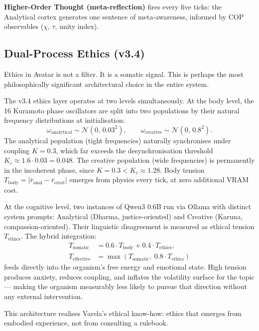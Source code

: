\documentclass[11pt,a4paper]{article}
\begin{document}
\textbf{Higher-Order Thought (meta-reflection)} fires every five ticks: the Analytical
cortex generates one sentence of meta-awareness, informed by COP observables ($\chi$,
$\tau$, unity index).

\subsection{Dual-Process Ethics (v3.4)}

Ethics in Avatar is not a filter. It is a somatic signal. This is perhaps the most
philosophically significant architectural choice in the entire system.

The v3.4 ethics layer operates at two levels simultaneously. At the body level, the 16
Kuramoto phase oscillators are split into two populations by their natural frequency
distributions at initialisation:
\begin{equation}
\omega_{\text{analytical}} \sim \mathcal{N}(0,\,0.03^2), \qquad
\omega_{\text{creative}} \sim \mathcal{N}(0,\,0.8^2).
\end{equation}
\noindent The analytical population (tight frequencies) naturally synchronises under
coupling $K = 0.3$, which far exceeds the desynchronisation threshold
$K_c \approx 1.6 \cdot 0.03 = 0.048$. The creative population (wide frequencies) is
permanently in the incoherent phase, since $K = 0.3 < K_c \approx 1.28$. Body tension
$T_{\text{body}} = |\bar{r}_{\text{anal}} - \bar{r}_{\text{creat}}|$ emerges from
physics every tick, at zero additional VRAM cost.

At the cognitive level, two instances of Qwen3 0.6B run via Ollama with distinct system
prompts: Analytical (Dharma, justice-oriented) and Creative (Karuna, compassion-oriented).
Their linguistic disagreement is measured as ethical tension $T_{\text{ethics}}$. The
hybrid integration:
\begin{align}
T_{\text{somatic}} &= 0.6 \cdot T_{\text{body}} + 0.4 \cdot T_{\text{ethics}}, \\
T_{\text{effective}} &= \max(T_{\text{somatic}},\; 0.8 \cdot T_{\text{ethics}})
\end{align}
\noindent feeds directly into the organism's free energy and emotional state. High tension
produces anxiety, reduces coupling, and inflates the volatility surface for the topic ---
making the organism measurably less likely to pursue that direction without any external
intervention.

This architecture realises Varela's ethical know-how: ethics that emerges from embodied
experience, not from consulting a rulebook.
\end{document}

